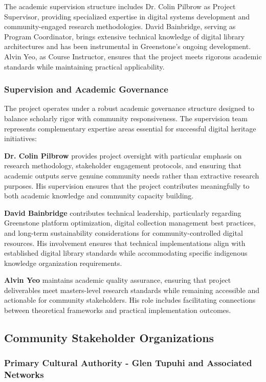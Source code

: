 The academic supervision structure includes Dr. Colin Pilbrow as Project Supervisor, providing specialized expertise in digital systems development and community-engaged research methodologies. David Bainbridge, serving as Program Coordinator, brings extensive technical knowledge of digital library architectures and has been instrumental in Greenstone's ongoing development. Alvin Yeo, as Course Instructor, ensures that the project meets rigorous academic standards while maintaining practical applicability.

\subsubsection{Supervision and Academic Governance}

The project operates under a robust academic governance structure designed to balance scholarly rigor with community responsiveness. The supervision team represents complementary expertise areas essential for successful digital heritage initiatives:

\textbf{Dr. Colin Pilbrow} provides project oversight with particular emphasis on research methodology, stakeholder engagement protocols, and ensuring that academic outputs serve genuine community needs rather than extractive research purposes. His supervision ensures that the project contributes meaningfully to both academic knowledge and community capacity building.

\textbf{David Bainbridge} contributes technical leadership, particularly regarding Greenstone platform optimization, digital collection management best practices, and long-term sustainability considerations for community-controlled digital resources. His involvement ensures that technical implementations align with established digital library standards while accommodating specific indigenous knowledge organization requirements.

\textbf{Alvin Yeo} maintains academic quality assurance, ensuring that project deliverables meet masters-level research standards while remaining accessible and actionable for community stakeholders. His role includes facilitating connections between theoretical frameworks and practical implementation outcomes.

\subsection{Community Stakeholder Organizations}

\subsubsection{Primary Cultural Authority - Glen Tupuhi and Associated Networks}

